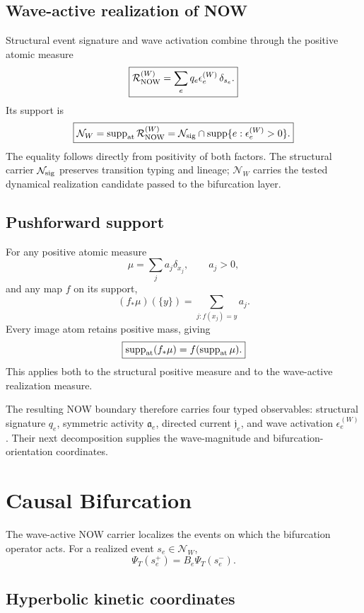 \documentclass[11pt]{book}
\begin{document}
\section{Wave-active realization of NOW}

Structural event signature and wave activation combine through the positive atomic measure
\[
\boxed{
\mathcal R_{\rm NOW}^{(W)}
=\sum_e q_e\epsilon_e^{(W)}\,\delta_{s_e}.
}
\]
Its support is
\[
\boxed{
\mathcal N_W
=\operatorname{supp}_{\rm at}\mathcal R_{\rm NOW}^{(W)}
=\mathcal N_{\rm sig}
\cap
\operatorname{supp}\{e:\epsilon_e^{(W)}>0\}.
}
\]
The equality follows directly from positivity of both factors.  The structural carrier $\mathcal N_{\rm sig}$ preserves transition typing and lineage; $\mathcal N_W$ carries the tested dynamical realization candidate passed to the bifurcation layer.

\section{Pushforward support}

For any positive atomic measure
\[
\mu=\sum_j a_j\delta_{x_j},
\qquad a_j>0,
\]
and any map $f$ on its support,
\[
(f_*\mu)(\{y\})
=\sum_{j:f(x_j)=y}a_j.
\]
Every image atom retains positive mass, giving
\[
\boxed{
\operatorname{supp}_{\rm at}(f_*\mu)
=f(\operatorname{supp}_{\rm at}\mu).
}
\]
This applies both to the structural positive measure and to the wave-active realization measure.

The resulting NOW boundary therefore carries four typed observables: structural signature $q_e$, symmetric activity $\mathfrak a_e$, directed current $\mathfrak j_e$, and wave activation $\epsilon_e^{(W)}$.  Their next decomposition supplies the wave-magnitude and bifurcation-orientation coordinates.

\chapter{Causal Bifurcation}

The wave-active NOW carrier localizes the events on which the bifurcation operator acts.  For a realized event $s_e\in\mathcal N_W$,
\[
\Psi_T(s_e^+)=B_e\Psi_T(s_e^-).
\]

\section{Hyperbolic kinetic coordinates}
\end{document}
